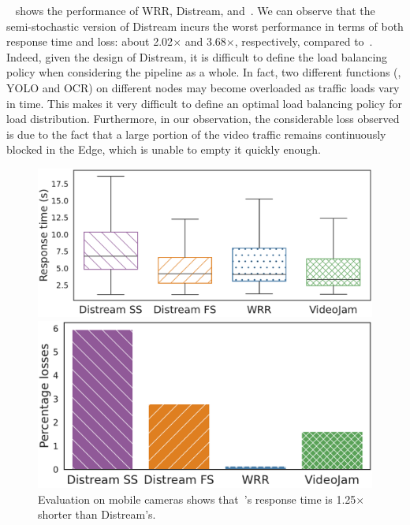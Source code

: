 ~ shows the performance of WRR, Distream, and~\videojam{}. We can observe that the semi-stochastic version of Distream incurs the worst performance in terms of both response time and loss: about 2.02$\times$ and 3.68$\times$, respectively, compared to~\videojam{}. Indeed, given the design of Distream, it is difficult to define the load balancing policy when considering the pipeline as a whole. In fact, two different functions (\eg, YOLO and OCR) on different nodes may become overloaded as traffic loads vary in time. This makes it very difficult to define an optimal load balancing policy for load distribution. Furthermore, in our observation, the considerable loss observed is due to the fact that a large portion of the video traffic remains continuously blocked in the Edge, which is unable to empty it quickly enough.

\begin{figure}
	\begin{minipage}[t]{.52\linewidth}
		\centering
		\includegraphics[width=\linewidth]{chapters/videojam/images/distream_vs_videojam/response_time.pdf}
	\end{minipage}
	\hfill
	\begin{minipage}[t]{.46\linewidth}
		\centering
		\includegraphics[width=\linewidth]{chapters/videojam/images/distream_vs_videojam/percentage_losses.pdf}
	\end{minipage}  
	\vspace{-1mm}
	\caption{Evaluation on mobile cameras shows that~\videojam{}'s response time is 1.25$\times$ shorter than Distream's.}
	\vspace{-3mm}
	\label{fig:distream_vs_videojam}
\end{figure}


